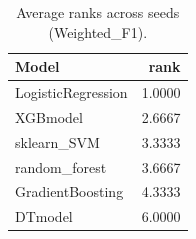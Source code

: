 \begin{table}[t]
\centering
\begin{tabular}{lr}
\toprule
Model & rank \\
\midrule
LogisticRegression & 1.0000 \\
XGBmodel & 2.6667 \\
sklearn_SVM & 3.3333 \\
random_forest & 3.6667 \\
GradientBoosting & 4.3333 \\
DTmodel & 6.0000 \\
\bottomrule
\end{tabular}
\caption{Average ranks across seeds (Weighted_F1).}
\label{tab:avg_rank_Weighted_F1}
\end{table}